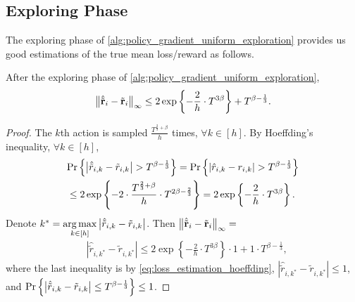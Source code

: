 \subsection{Exploring Phase}
\label{subsec:exploring_phase}

The exploring phase of \cref{alg:policy_gradient_uniform_exploration} provides us good estimations of the true mean loss/reward as follows.
\begin{thm}
\label{thm:loss_estimation_hoeffding}
    After the exploring phase of \cref{alg:policy_gradient_uniform_exploration},
\begin{equation*}
    \left\| \hat{{\tilde{\mathbf{r}}}}_i - {\tilde{\mathbf{r}}}_i \right\|_\infty \le 2 \exp\left\{ - \frac{2}{h} \cdot  T^{3\beta} \right\} + T^{\beta - \frac{1}{3}}.
\end{equation*}
\end{thm}
\begin{proof}
    The $k$th action is sampled $\frac{T^{\frac{2}{3} + \beta} }{h}$ times, $\forall k \in [h]$. By Hoeffding's inequality, $\forall k \in [h]$,
\begin{equation}
\label{eq:loss_estimation_hoeffding}
\begin{split}
    &{\text{Pr}}\left\{ \left| \hat{\tilde{r}}_{i, k} - \tilde{r}_{i,k} \right| > T^{\beta - \frac{1}{3}} \right\} = {\text{Pr}}\left\{ \left| \hat{r}_{i, k} - r_{i,k} \right| > T^{\beta - \frac{1}{3}} \right\} \\
    &\le 2 \exp\left\{ - 2 \cdot  \frac{T^{\frac{2}{3} + \beta}}{h} \cdot T^{2\beta - \frac{2}{3}} \right\} = 2 \exp\left\{ - \frac{2}{h} \cdot  T^{3\beta} \right\}.
\end{split}
\end{equation}
Denote $k^* = \operatorname*{arg\,max}\limits_{k \in [h]}{ \left| \hat{\tilde{r}}_{i, k} - \tilde{r}_{i,k} \right| }$. Then $\left\| \hat{{\tilde{\mathbf{r}}}}_i - {\tilde{\mathbf{r}}}_i \right\|_\infty =$
\begin{equation*}
\begin{split}
    &\left| \hat{\tilde{r}}_{i, k^*} - \tilde{r}_{i,k^*} \right| \le 2 \exp\left\{ - \frac{2}{h} \cdot  T^{3\beta} \right\} \cdot 1 + 1 \cdot T^{\beta - \frac{1}{3}},
\end{split}
\end{equation*}
where the last inequality is by \cref{eq:loss_estimation_hoeffding}, $\left| \hat{\tilde{r}}_{i, k^*} - \tilde{r}_{i,k^*} \right| \le 1$, and ${\text{Pr}}\left\{ \left| \hat{\tilde{r}}_{i, k} - \tilde{r}_{i,k} \right| \le T^{\beta - \frac{1}{3}} \right\} \le 1$. 
\end{proof}

